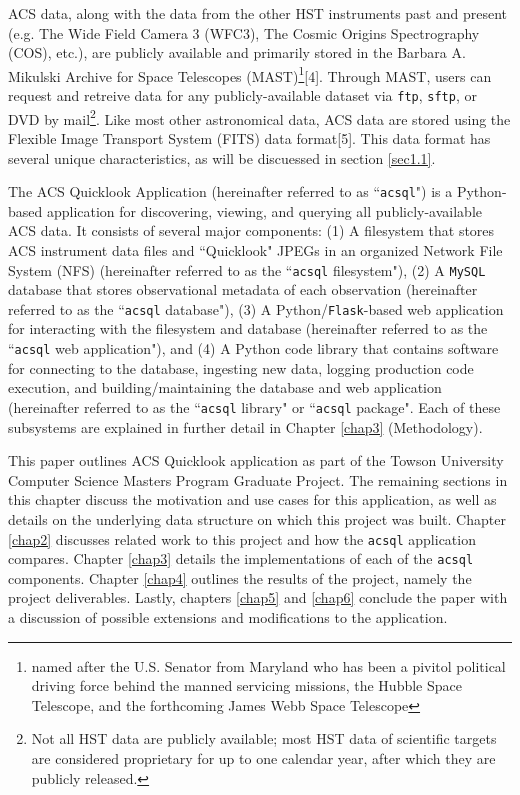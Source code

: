 \documentclass[10pt,journal,compsoc]{IEEEtran}
\begin{document}
ACS data, along with the data from the other HST instruments past and present (e.g. The Wide Field Camera 3 (WFC3), The Cosmic Origins
Spectrography (COS), etc.), are publicly available and primarily stored in the Barbara A. Mikulski Archive for Space Telescopes
(MAST)\footnote{named after the U.S. Senator from Maryland who has been a pivitol political driving force behind the manned servicing
missions, the Hubble Space Telescope, and the forthcoming James Webb Space Telescope}[4]. Through MAST, users can request and retreive
data for any publicly-available dataset via \texttt{ftp}, \texttt{sftp}, or DVD by mail\footnote{Not all HST data are publicly available;
most HST data of scientific targets are considered proprietary for up to one calendar year, after which they are publicly released.}. Like most
other astronomical data, ACS data are stored using the Flexible Image Transport System (FITS) data format[5].  This data format has several
unique characteristics, as will be discuessed in section \ref{sec1.1}.

The ACS Quicklook Application (hereinafter referred to as ``\texttt{acsql}") is a Python-based application for discovering, viewing, and
querying all publicly-available ACS data.  It consists of several major components: (1) A filesystem that stores ACS instrument data files
and ``Quicklook" JPEGs in an organized Network File System (NFS) (hereinafter referred to as the ``\texttt{acsql} filesystem"), (2) A
\texttt{MySQL} database that stores observational metadata of each observation (hereinafter referred to as the ``\texttt{acsql} database"),
(3) A Python/\texttt{Flask}-based web application for interacting with the filesystem and database (hereinafter referred to as the
``\texttt{acsql} web application"), and (4) A Python code library that contains software for connecting to the database, ingesting new data,
logging production code execution, and building/maintaining the database and web application (hereinafter referred to as the ``\texttt{acsql} library"
or ``\texttt{acsql} package".  Each of these subsystems are explained in further detail in Chapter \ref{chap3} (Methodology).

This paper outlines ACS Quicklook application as part of the Towson University Computer Science Masters Program Graduate Project.  The remaining
sections in this chapter discuss the motivation and use cases for this application, as well as details on the underlying data structure on
which this project was built.  Chapter \ref{chap2} discusses related work to this project and how the \texttt{acsql} application compares.
Chapter \ref{chap3} details the implementations of each of the \texttt{acsql} components.  Chapter \ref{chap4} outlines the results of the project, namely
the project deliverables.  Lastly, chapters \ref{chap5} and \ref{chap6} conclude the paper with a discussion of possible extensions and modifications to
the application.
\end{document}
